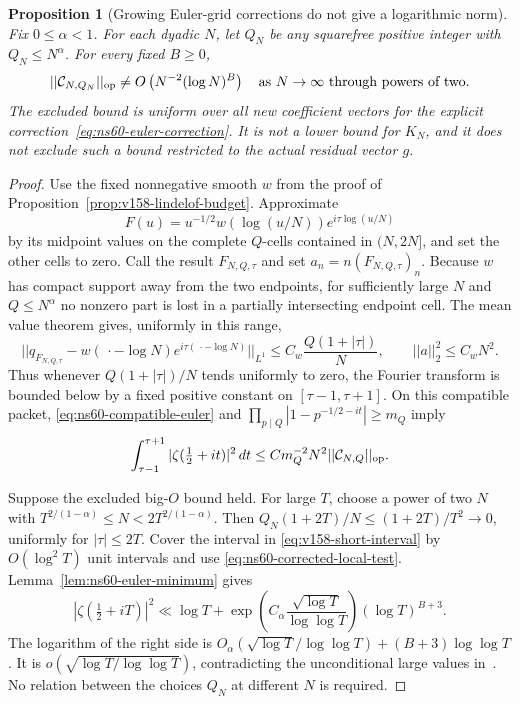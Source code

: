 \documentclass[11pt]{article}
\def\norm#1{||#1||}%
\newtheorem{proposition}[theorem]{Proposition}
\theoremstyle{remark}
\newcommand{\norm}[1]{\left\lVert #1\right\rVert}
\begin{document}
\begin{proposition}[Growing Euler-grid corrections do not give a logarithmic norm]
\label{prop:ns60-growing-euler-obstruction}
Fix $0\leq\alpha<1$. For each dyadic $N$, let $Q_N$ be any squarefree
positive integer with $Q_N\leq N^\alpha$. For every fixed $B\geq0$,
\begin{equation}
 \norm{\mathcal C_{N,Q_N}}_{\rm op}
 \ne O\left(N^{-2}(\log N)^B\right)
 \quad\text{as }N\to\infty\text{ through powers of two}.
 \label{eq:ns60-growing-no-log}
\end{equation}
The excluded bound is uniform over all new coefficient vectors for the
explicit correction~\eqref{eq:ns60-euler-correction}. It is not a lower
bound for $K_N$, and it does not exclude such a bound restricted to the
actual residual vector $g$.
\end{proposition}
\begin{proof}
Use the fixed nonnegative smooth $w$ from the proof of
Proposition~\ref{prop:v158-lindelof-budget}. Approximate
\[
 F(u)=u^{-1/2}w(\log(u/N))e^{i\tau\log(u/N)}
\]
by its midpoint values on the complete $Q$-cells contained in $(N,2N]$,
and set the other cells to zero. Call the result $F_{N,Q,\tau}$ and set
$a_n=n(F_{N,Q,\tau})_n$. Because $w$ has compact support away from the
two endpoints, for sufficiently large $N$ and $Q\leq N^\alpha$ no
nonzero part is lost in a partially intersecting endpoint cell.
The mean value theorem gives, uniformly in this range,
\begin{equation}
 \norm{q_{F_{N,Q,\tau}}
       -w(\,\cdot-\log N)e^{i\tau(\,\cdot-\log N)}}_{L^1}
 \leq C_w\frac{Q(1+|\tau|)}N,
 \qquad \norm{a}_2^2\leq C_wN^2.
 \label{eq:ns60-packet-grid-error}
\end{equation}
Thus whenever $Q(1+|\tau|)/N$ tends uniformly to zero, the Fourier
transform is bounded below by a fixed positive constant on
$[\tau-1,\tau+1]$. On this compatible packet,
\eqref{eq:ns60-compatible-euler} and
$\prod_{p\mid Q}|1-p^{-1/2-it}|\geq m_Q$ imply
\begin{equation}
 \int_{\tau-1}^{\tau+1}|\zeta(\tfrac12+it)|^2\,dt
 \leq C m_Q^{-2} N^2\norm{\mathcal C_{N,Q}}_{\rm op}.
 \label{eq:ns60-corrected-local-test}
\end{equation}

Suppose the excluded big-$O$ bound held. For large $T$, choose a power
of two $N$ with
$T^{2/(1-\alpha)}\leq N<2T^{2/(1-\alpha)}$.
Then $Q_N(1+2T)/N\leq(1+2T)/T^2\to0$, uniformly for
$|\tau|\leq2T$. Cover the interval in
\eqref{eq:v158-short-interval} by $O(\log^2T)$ unit intervals and use
\eqref{eq:ns60-corrected-local-test}. Lemma~\ref{lem:ns60-euler-minimum}
gives
\[
 |\zeta(\tfrac12+iT)|^2
 \ll \log T+
 \exp\left(C_\alpha\frac{\sqrt{\log T}}{\log\log T}\right)
 (\log T)^{B+3}.
\]
The logarithm of the right side is
$O_\alpha(\sqrt{\log T}/\log\log T)+(B+3)\log\log T$.
It is $o(\sqrt{\log T/\log\log T})$, contradicting the unconditional
large values in~\cite[Theorem 1]{Soundararajan2008}.
No relation between the choices $Q_N$ at different $N$ is required.
\end{proof}
\end{document}
